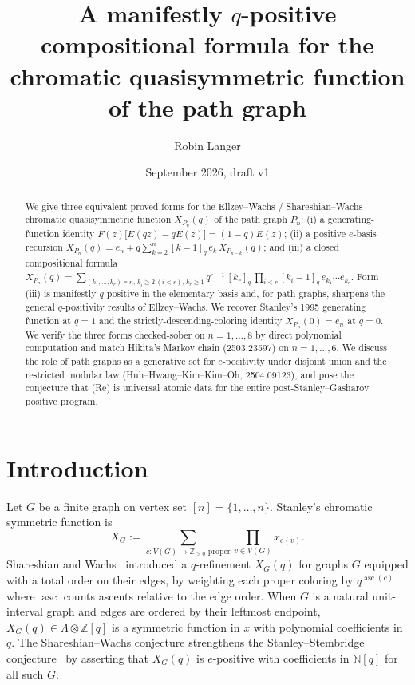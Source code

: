 \documentclass[11pt,a4paper]{amsart}
\title{A manifestly $q$-positive compositional formula for the chromatic
quasisymmetric function of the path graph}
\author{Robin Langer}
\date{September 2026, draft v1}
\theoremstyle{definition}
\DeclareMathOperator{\asc}{asc}
\newcommand{\CQF}{X}
\newcommand{\Path}{P}
\newcommand{\Sym}{\Lambda}
\newcommand{\qint}[1]{[#1]_q}
\newcommand{\vDashn}{\vDash}
\begin{document}
\begin{abstract}
We give three equivalent proved forms for the Ellzey--Wachs / Shareshian--Wachs
chromatic quasisymmetric function $\CQF_{\Path_n}(q)$ of the path graph
$\Path_n$: (i) a generating-function identity
$F(z)\bigl[E(qz) - qE(z)\bigr] = (1-q)E(z)$; (ii) a positive $e$-basis recursion
$\CQF_{\Path_n}(q) = e_n + q\sum_{k=2}^n \qint{k-1}\, e_k\, \CQF_{\Path_{n-k}}(q)$;
and (iii) a closed compositional formula
$\CQF_{\Path_n}(q) = \sum_{(k_1,\ldots,k_r)\vDashn n,\, k_i \ge 2\ (i<r),\, k_r \ge 1}
q^{r-1}\, \qint{k_r}\, \prod_{i<r}\qint{k_i-1}\, e_{k_1}\cdots e_{k_r}$.
Form (iii) is manifestly $q$-positive in the elementary basis and, for
path graphs, sharpens the general $q$-positivity results of Ellzey--Wachs.
We recover Stanley's 1995 generating function at $q = 1$ and the
strictly-descending-coloring identity $\CQF_{\Path_n}(0) = e_n$ at $q = 0$.
We verify the three forms checked-sober on $n = 1, \ldots, 8$ by direct
polynomial computation and match Hikita's Markov chain (2503.23597) on
$n = 1, \ldots, 6$. We discuss the role of path graphs as a generative
set for $e$-positivity under disjoint union and the restricted modular
law (Huh--Hwang--Kim--Kim--Oh, 2504.09123), and pose the conjecture that
(Re) is universal atomic data for the entire post-Stanley--Gasharov
positive program.
\end{abstract}

\maketitle

\section{Introduction}

Let $G$ be a finite graph on vertex set $[n] = \{1, \ldots, n\}$.
Stanley's chromatic symmetric function is
\[
  \CQF_G := \sum_{c: V(G) \to \mathbb{Z}_{>0}\text{ proper}} \prod_{v \in V(G)} x_{c(v)}.
\]
Shareshian and Wachs~\cite{ShareshianWachs2016} introduced a $q$-refinement
$\CQF_G(q)$ for graphs $G$ equipped with a total order on their edges,
by weighting each proper coloring by $q^{\asc(c)}$ where $\asc$ counts
ascents relative to the edge order. When $G$ is a natural unit-interval
graph and edges are ordered by their leftmost endpoint, $\CQF_G(q) \in
\Sym \otimes \mathbb{Z}[q]$ is a symmetric function in $x$ with polynomial
coefficients in $q$. The Shareshian--Wachs conjecture strengthens the
Stanley--Stembridge conjecture~\cite{StanleyStembridge1993} by asserting
that $\CQF_G(q)$ is $e$-positive with coefficients in $\mathbb{N}[q]$
for all such $G$.
\end{document}
